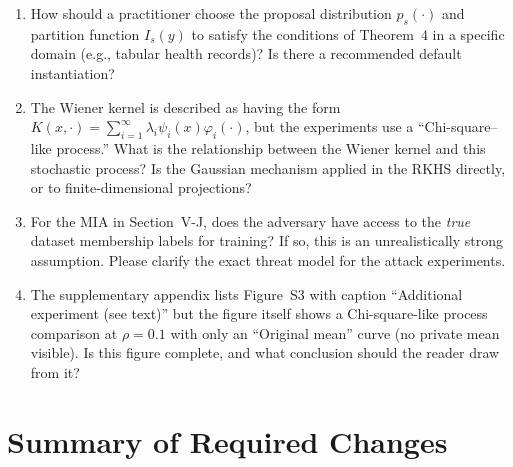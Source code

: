 \documentclass[12pt]{article}
\begin{document}
\begin{enumerate}[label=\textbf{Q\arabic*.}, leftmargin=*, wide=0pt]

\item How should a practitioner choose the proposal distribution $p_s(\cdot)$ and partition function $I_s(y)$ to satisfy the conditions of Theorem~4 in a specific domain (e.g., tabular health records)? Is there a recommended default instantiation?

\item The Wiener kernel is described as having the form $K(x,\cdot) = \sum_{i=1}^\infty \lambda_i \psi_i(x)\varphi_i(\cdot)$, but the experiments use a ``Chi-square--like process.'' What is the relationship between the Wiener kernel and this stochastic process? Is the Gaussian mechanism applied in the RKHS directly, or to finite-dimensional projections?

\item For the MIA in Section~V-J, does the adversary have access to the \emph{true} dataset membership labels for training? If so, this is an unrealistically strong assumption. Please clarify the exact threat model for the attack experiments.

\item The supplementary appendix lists Figure~S3 with caption ``Additional experiment (see text)'' but the figure itself shows a Chi-square-like process comparison at $\rho = 0.1$ with only an ``Original mean'' curve (no private mean visible). Is this figure complete, and what conclusion should the reader draw from it?

\end{enumerate}

\section{Summary of Required Changes}
\end{document}
